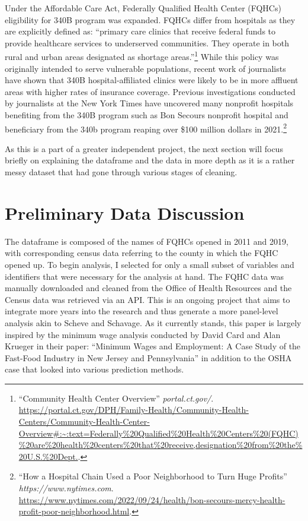 \documentclass[12pt, ]{article}
\begin{document}
Under the Affordable Care Act, Federally Qualified Health Center (FQHCs)
eligibility for 340B program was expanded. FQHCs differ from hospitals
as they are explicitly defined as: ``primary care clinics that receive
federal funds to provide healthcare services to underserved communities.
They operate in both rural and urban areas designated as shortage
areas.''\footnote{``Community Health Center Overview''
  \emph{portal.ct.gov/}.
  \url{https://portal.ct.gov/DPH/Family-Health/Community-Health-Centers/Community-Health-Center-Overview\#:~:text=Federally\%20Qualified\%20Health\%20Centers\%20(FQHC)\%20are\%20health\%20centers\%20that\%20receive,designation\%20from\%20the\%20U.S.\%20Dept.}.}
While this policy was originally intended to serve vulnerable
populations, recent work of journalists have shown that 340B
hospital-affiliated clinics were likely to be in more affluent areas
with higher rates of insurance coverage. Previous investigations
conducted by journalists at the New York Times have uncovered many
nonprofit hospitals benefiting from the 340B program such as Bon Secours
nonprofit hospital and beneficiary from the 340b program reaping over
\$100 million dollars in 2021.\footnote{``How a Hospital Chain Used a
  Poor Neighborhood to Turn Huge Profits''
  \emph{https://www.nytimes.com}.
  \url{https://www.nytimes.com/2022/09/24/health/bon-secours-mercy-health-profit-poor-neighborhood.html}.}

As this is a part of a greater independent project, the next section
will focus briefly on explaining the dataframe and the data in more
depth as it is a rather messy dataset that had gone through various
stages of cleaning.

\hypertarget{preliminary-data-discussion}{%
\section{Preliminary Data
Discussion}\label{preliminary-data-discussion}}

The dataframe is composed of the names of FQHCs opened in 2011 and 2019,
with corresponding census data referring to the county in which the FQHC
opened up. To begin analysis, I selected for only a small subset of
variables and identifiers that were necessary for the analysis at hand.
The FQHC data was manually downloaded and cleaned from the Office of
Health Resources and the Census data was retrieved via an API. This is
an ongoing project that aims to integrate more years into the research
and thus generate a more panel-level analysis akin to Scheve and
Schavage. As it currently stands, this paper is largely inspired by the
minimum wage analysis conducted by David Card and Alan Krueger in their
paper: ``Minimum Wages and Employment: A Case Study of the Fast-Food
Industry in New Jersey and Pennsylvania'' in addition to the OSHA case
that looked into various prediction methods.
\end{document}
